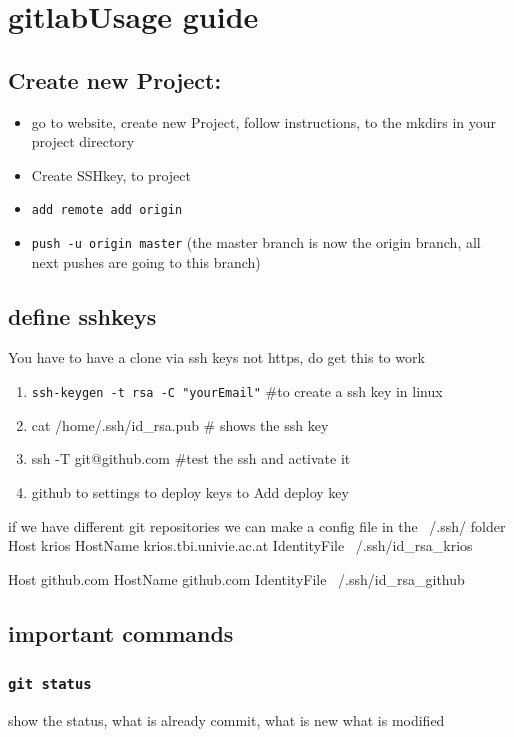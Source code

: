 \documentclass[ twoside,openright,titlepage,numbers=noenddot,headinclude,%
                footinclude=true, cleardoublepage=empty,abstractoff, %
                BCOR=5mm,paper=a4,fontsize=11pt,%
                ]{scrreprt}
\begin{document}
\chapter{gitlabUsage guide}
\section{Create new Project:}

\begin{itemize}
	\item go to website, create new Project, follow instructions, to the mkdirs in  your project directory
	\item Create SSHkey, to project
	\item \texttt{add remote add origin}
	\item \texttt{push -u origin master}    (the master branch is now the origin branch, all next pushes are going to this branch)
\end{itemize}

\section{define sshkeys}

You have to have a clone via ssh keys not https, do get this to work
\begin{enumerate}
\item \texttt{ssh-keygen -t rsa -C "yourEmail"} \#to create a ssh key in linux
\item cat /home/.ssh/id\_rsa.pub   \# shows the ssh key
\item ssh -T git@github.com  \#test the ssh and activate it
\item github to settings to deploy keys to Add deploy key
\end{enumerate}

if we have different git repositories we can make a config file in the 
~/.ssh/ folder
Host krios
HostName krios.tbi.univie.ac.at
IdentityFile ~/.ssh/id\_rsa\_krios

Host github.com
HostName github.com
IdentityFile ~/.ssh/id\_rsa\_github




\section{important commands}
\subsection{\texttt{git status}}
	show the status, what is already commit, what is new what is modified
\end{document}
